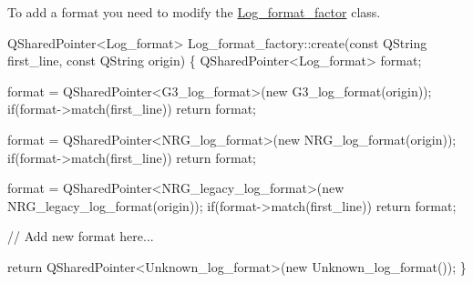 To add a format you need to modify the \hyperlink{class_log__viewer_1_1_log__format__factory}{Log\-\_\-format\-\_\-factor} class. 
\begin{DoxyCode}
QSharedPointer<Log\_format> Log\_format\_factory::create(\textcolor{keyword}{const} QString first\_line, \textcolor{keyword}{const} QString origin)
\{
    QSharedPointer<Log\_format> format;

    format = QSharedPointer<G3\_log\_format>(\textcolor{keyword}{new} G3\_log\_format(origin));
    \textcolor{keywordflow}{if}(format->match(first\_line))
        \textcolor{keywordflow}{return} format;

    format = QSharedPointer<NRG\_log\_format>(\textcolor{keyword}{new} NRG\_log\_format(origin));
    \textcolor{keywordflow}{if}(format->match(first\_line))
        \textcolor{keywordflow}{return} format;

    format = QSharedPointer<NRG\_legacy\_log\_format>(\textcolor{keyword}{new} NRG\_legacy\_log\_format(origin));
    \textcolor{keywordflow}{if}(format->match(first\_line))
        \textcolor{keywordflow}{return} format;

    \textcolor{comment}{// Add new format here...}

    \textcolor{keywordflow}{return} QSharedPointer<Unknown\_log\_format>(\textcolor{keyword}{new} Unknown\_log\_format());
\}
\end{DoxyCode}
 